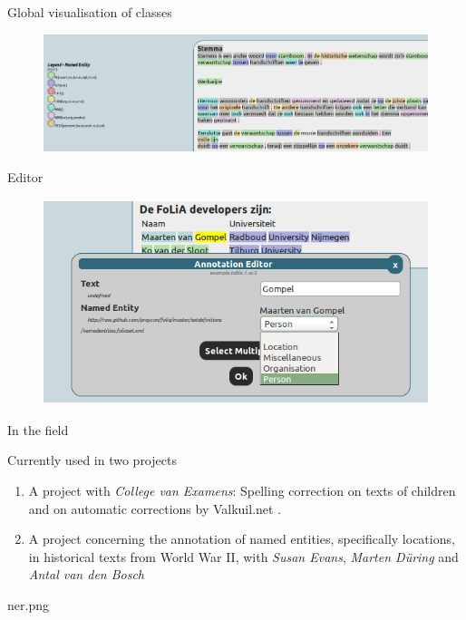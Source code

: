 \documentclass[xcolor=table,10pt,t]{beamer}
\begin{document}
\begin{frame}{Global visualisation of classes}
  \begin{figure}
        \includegraphics[width=15cm]{highlight2.png}
    \end{figure}
\end{frame}

\begin{frame}{Editor}
  \begin{figure}
        \includegraphics[height=6cm]{edit2.png}
    \end{figure}
\end{frame}

\begin{frame}{In the field}
  \begin{block}{Currently used in two projects}
    \begin{enumerate}
      \item A project with \emph{College van Examens}: Spelling correction on
        texts of children and on automatic corrections by Valkuil.net . 
      \item A project concerning the annotation of named entities, specifically
        locations, in historical texts from World War II, with \emph{Susan Evans},
        \emph{Marten Düring} and \emph{Antal van den Bosch}
    \end{enumerate}
  \end{block}
\end{frame}

\begin{tussenpagina}{ }{ }{ner.png}
\end{tussenpagina}
\end{document}
